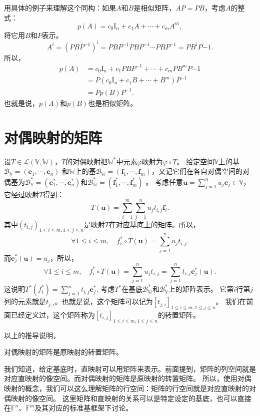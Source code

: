 \documentclass[12pt,UTF8]{ctexbook}
\begin{document}
用具体的例子来理解这个同构：如果$A$和$B$是相似矩阵，$AP = PB$，考虑$A$的整式：
$$p(A) = c_0\mathrm{I}_n + c_1 A + \cdots + c_m A^m,$$
将它用$B$和$P$表示。
$$A^i = \left(PBP^{-1}\right)^i = PBP^{-1} PBP^{-1} \cdots PBP^{-1} = PB^iP{-1}.$$
所以，
\begin{align*}
    p(A) &= c_0\mathrm{I}_n + c_1 PBP^{-1} + \cdots + c_m PB^mP{-1}  \\
    &= P\left(c_0\mathrm{I}_n + c_1 B + \cdots + B^m\right)P^{-1}  \\
    &= Pp(B)P^{-1}.  
\end{align*}
也就是说，$p(A)$和$p(B)$也是相似矩阵。

\section{对偶映射的矩阵}
设$T \in \mathcal{L}(\mathbb{V}, \mathbb{W})$，$T$的对偶映射把$\mathbb{W}^*$中元素$\varphi$映射为$\varphi \circ T$。
给定空间$\mathbb{V}$上的基$\mathcal{B}_\mathbb{V} = (\mathbf{e}_1, \cdots, \mathbf{e}_n)$
和$\mathbb{W}$上的基$\mathcal{B}_\mathbb{W} = (\mathbf{f}_1, \cdots, \mathbf{f}_m)$，又记它们在各自对偶空间的对偶基为$\mathcal{B}_\mathbb{V}^* = (\mathbf{e}_1^*, \cdots, \mathbf{e}_n^*)$和$\mathcal{B}_\mathbb{W}^* = (\mathbf{f}_1^*, \cdots, \mathbf{f}_m^*)$ 。
考虑任意$\mathbf{u} = \sum_{j=1}^n u_j \mathbf{e}_j \in \mathbb{V}$，它经过映射$T$得到：
$$ T(\mathbf{u}) =  \sum_{i=1}^m \sum_{j=1}^n u_j t_{i,j} \mathbf{f}_i.$$
其中$(t_{i, j})_{1\leqslant i\leqslant m, 1\leqslant j\leqslant n}$是映射$T$在对应基底上的矩阵。所以，
$$ \forall 1\leqslant i\leqslant m, \quad f_i^*\circ T(\mathbf{u}) = \sum_{j=1}^n u_j t_{i,j}.$$
而$\mathbf{e}_j^*(\mathbf{u}) = u_j$，所以，
$$ \forall 1\leqslant i\leqslant m, \quad f_i^*\circ T(\mathbf{u}) = \sum_{j=1}^n u_j t_{i,j} = \sum_{j=1}^n t_{i,j} \mathbf{e}_j^*(\mathbf{u}).$$
这说明$T^*(f_i^*) = \sum_{j=1}^n t_{i,j} \mathbf{e}_j^* $. 
考虑$T^*$在基底$\mathcal{B}_\mathbb{W}^*$和$\mathcal{B}_\mathbb{V}^*$上的矩阵表示。
它第$i$行第$j$列的元素就是$t_{j,i}$。也就是说，这个矩阵可以记为$[t_{j,i}]_{1\leqslant i\leqslant m, 1\leqslant j\leqslant n}$。
我们在前面已经定义过，这个矩阵称为$[t_{i,j}]_{1\leqslant i\leqslant m, 1\leqslant j\leqslant n}$的转置矩阵。

以上的推导说明，
\begin{pp}\label{pp:5_4}
对偶映射的矩阵是原映射的转置矩阵。
\end{pp}

我们知道，给定基底时，直映射可以用矩阵来表示。前面提到，矩阵的列空间就是对应直映射的像空间。而对偶映射的矩阵是原映射的转置矩阵。
所以，使用对偶映射的概念，我们可以这么理解矩阵的行空间：矩阵的行空间就是对应直映射的对偶映射的像空间。
这里矩阵和直映射的关系可以是特定设定的基底，也可以直接在$\mathbb{F}^n$、$\mathbb{F}^m$及其对应的标准基框架下讨论。
\end{document}
